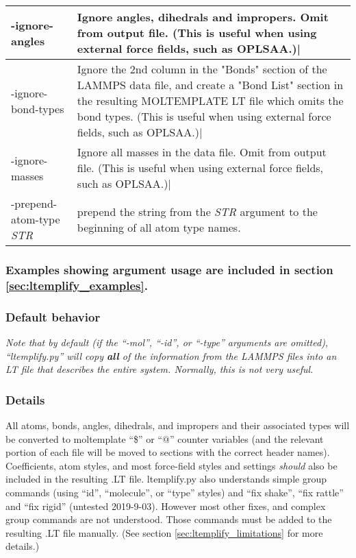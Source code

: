 \documentclass[11pt]{article}
\begin{document}
\begin{tabular}[h]{l|p{10cm}}
-ignore-angles
&
Ignore angles, dihedrals and impropers.  Omit from output file.
(This is useful when using external force fields, such as OPLSAA.)|
\\
\hline

-ignore-bond-types
&
Ignore the 2nd column in the "Bonds" section of the LAMMPS data file,
and create a "Bond List" section in the resulting MOLTEMPLATE LT file
which omits the bond types.
(This is useful when using external force fields, such as OPLSAA.)|
\\
\hline

-ignore-masses
&
Ignore all masses in the data file.  Omit from output file.
(This is useful when using external force fields, such as OPLSAA.)|
\\
\hline

-prepend-atom-type \textit{STR}
&
prepend the string from the \textit{STR} argument to the beginning of
all atom type names.
\\
\hline
\end{tabular}


\subsubsection*{Examples showing argument usage are included
                in section \ref{sec:ltemplify_examples}.}

\pagebreak


\subsubsection*{Default behavior}
\textit{Note that by default
(if the ``-mol'', ``-id'', or ``-type'' arguments are omitted),
``ltemplify.py'' will copy \textbf{all} of the information
from the LAMMPS files into an LT file that describes the entire system.
Normally, this is not very useful.}



\subsubsection*{Details}

All atoms, bonds, angles, dihedrals, and impropers and their associated
types will be converted to moltemplate ``\$'' or ``@'' counter variables
(and the relevant portion of each file will be moved to sections
with the correct header names).
Coefficients, atom styles, and most force-field styles and
settings \textit{should} also be included in the resulting .LT file.
ltemplify.py also understands simple group commands
(using ``id'', ``molecule'', or ``type'' styles)
and ``fix shake'', ``fix rattle'' and ``fix rigid''  (untested 2019-9-03).
However most other fixes, and complex group commands are not understood.
Those commands must be added to the resulting .LT file manually.
(See section \ref{sec:ltemplify_limitations} for more details.)
\end{document}
